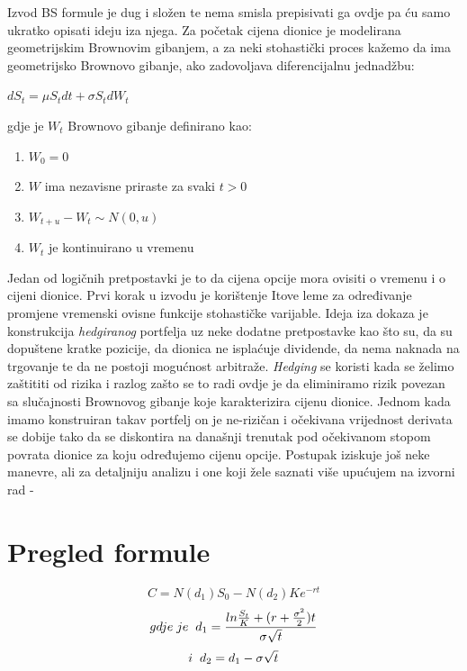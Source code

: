 \documentclass[times, utf8, seminar]{fer}
\begin{document}
Izvod BS formule je dug i složen te nema smisla prepisivati ga ovdje pa ću samo ukratko opisati ideju iza njega. Za početak cijena dionice je modelirana geometrijskim Brownovim gibanjem, a za neki stohastički proces kažemo da ima geometrijsko Brownovo gibanje, ako zadovoljava diferencijalnu jednadžbu:\\

\begin{centering}
    $dS_t = \mu S_t dt + \sigma S_t dW_t$ \\
\end{centering}

\vspace{1.5cm}

\noindent gdje je $W_t$ Brownovo gibanje definirano kao:
\begin{enumerate}
    \item $W_0 = 0$
    \item $W$ ima nezavisne priraste za svaki $t > 0$
    \item $W_{t+u} - W_t \sim N(0, u)$
    \item $W_t$ je kontinuirano u vremenu
\end{enumerate}

Jedan od logičnih pretpostavki je to da cijena opcije mora ovisiti o vremenu i o cijeni dionice. Prvi korak u izvodu je korištenje Itove leme za određivanje promjene vremenski ovisne funkcije stohastičke varijable. Ideja iza dokaza je konstrukcija \textit{hedgiranog} portfelja uz neke dodatne pretpostavke kao što su, da su dopuštene kratke pozicije, da dionica ne isplaćuje dividende, da nema naknada na trgovanje te da ne postoji mogućnost arbitraže. \textit{Hedging} se koristi kada se želimo zaštititi od rizika i razlog zašto se to radi ovdje je da eliminiramo rizik povezan sa slučajnosti Brownovog gibanje koje karakterizira cijenu dionice. Jednom kada imamo konstruiran takav portfelj on je ne-rizičan  i očekivana vrijednost derivata se dobije tako da se diskontira na današnji trenutak pod očekivanom stopom povrata dionice za koju određujemo cijenu opcije. Postupak iziskuje još neke manevre, ali za detaljniju analizu i one koji žele saznati više upućujem na izvorni rad - \cite{black2019pricing}

\section{Pregled formule}

\[ C = N(d_1)S_0 - N(d_2)Ke^{-rt} \]
\[ gdje \hspace{0.1cm} je \hspace{0.2cm} d_1 = \frac{ln\frac{S_t}{K} + (r+\frac{\sigma^2}{2})t}{\sigma\sqrt{t}} \]
\[i \hspace{0.2cm} d_2 = d_1 - \sigma \sqrt{t}\]
\end{document}
